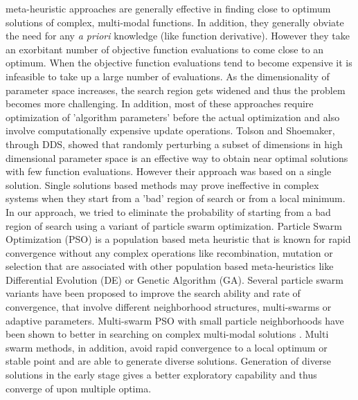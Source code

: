 \documentclass[12pt]{article}
\begin{document}
meta-heuristic approaches are generally effective in finding close to optimum solutions of complex, multi-modal functions. In addition, they generally obviate the need for any \textit{a priori} knowledge (like function derivative). However they take an exorbitant number of objective function evaluations to come close to an optimum. When the objective function evaluations tend to become expensive it is infeasible to take up a large number of evaluations. As the dimensionality of parameter space increases, the search region gets widened and thus the problem becomes more challenging.  In addition, most of these approaches require optimization of  'algorithm parameters' before the actual optimization and also involve computationally expensive update operations.  Tolson and Shoemaker, through DDS, showed that randomly perturbing a subset of dimensions in high dimensional parameter space is an effective way to obtain near optimal solutions with few function evaluations. However their approach was based on a single solution. Single solutions based methods may prove ineffective in complex systems when they start from a 'bad' region of search or from a local minimum. In our approach, we tried to eliminate the probability of starting from a bad region of search using a variant of particle swarm optimization. Particle Swarm Optimization (PSO) is a population based meta heuristic that is known for rapid convergence without any complex operations like recombination, mutation or selection that are associated with other population based meta-heuristics like Differential Evolution (DE) or Genetic Algorithm (GA). Several particle swarm variants have been proposed to improve the search ability and rate of convergence, that involve different neighborhood structures, multi-swarms or adaptive parameters. Multi-swarm PSO with small particle neighborhoods have been shown to better in searching on complex multi-modal solutions \cite{zhao2008dynamic}. Multi swarm methods, in addition, avoid rapid convergence to a local optimum or stable point and are able to generate diverse solutions.  Generation of diverse solutions in the early stage gives a better exploratory capability and thus converge of upon multiple optima.
\end{document}
